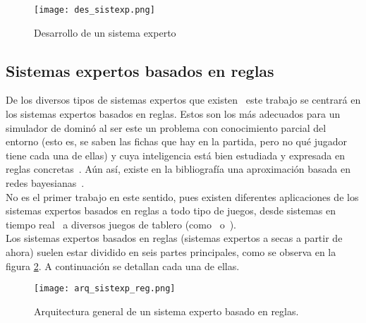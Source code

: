 \begin{figure}[h]
  \begin{center}
    \texttt{[image: des\_sistexp.png]}
  \end{center}
  \caption{Desarrollo de un sistema experto}
  \label{fig:des_sistexp}
\end{figure}


\subsection{Sistemas expertos basados en reglas}

De los diversos tipos de sistemas expertos que existen~\cite{ShuHsienLiao200593} este trabajo se centrará en los sistemas expertos basados en reglas. Estos son los más adecuados para un simulador de dominó al ser este un problema con conocimiento parcial del entorno (esto es, se saben las fichas que hay en la partida, pero no qué jugador tiene cada una de ellas) y cuya inteligencia está bien estudiada y expresada en reglas concretas~\cite{Borrajo1990129}. Aún así, existe en la bibliografía una aproximación basada en redes bayesianas~\cite{PFCRoss}. \\

No es el primer trabajo en este sentido, pues existen diferentes aplicaciones de los sistemas expertos basados en reglas a todo tipo de juegos, desde sistemas en tiempo real~\cite{DBLP:conf/robocup/FathzadehMMS05} a diversos juegos de tablero (como~\cite{PFCRecio} o~\cite{PFCChaves}). \\

Los sistemas expertos basados en reglas (sistemas expertos a secas a partir de
ahora) suelen estar dividido en seis partes principales, como se
observa en la figura \ref{fig:arq_sistexp_reg}. A continuación se
detallan cada una de ellas.

\begin{figure}[h]
  \begin{center}
    \texttt{[image: arq\_sistexp\_reg.png]}
  \end{center}
  \caption{Arquitectura general de un sistema experto basado en reglas.}
  \label{fig:arq_sistexp_reg}
\end{figure}

